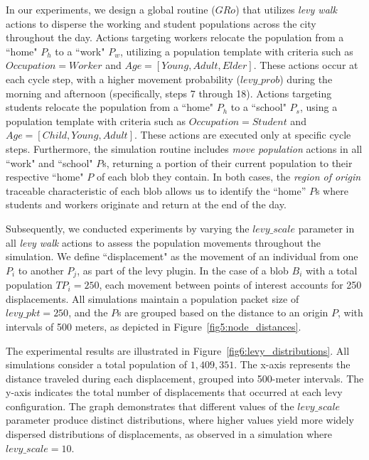 \documentclass[pdflatex,sn-mathphys-num]{sn-jnl}%
\theoremstyle{thmstyleone}%
\theoremstyle{thmstyletwo}%
\theoremstyle{thmstylethree}%
\begin{document}
In our experiments, we design a global routine ($GRo$) that utilizes \textit{levy walk} actions to disperse the working and student populations across the city throughout the day. Actions targeting workers relocate the population from a ``home" $P_h$ to a ``work" $P_w$, utilizing a population template with criteria such as $Occupation = Worker$ and $Age = [Young, Adult, Elder]$. These actions occur at each cycle step, with a higher movement probability ($levy\_prob$) during the morning and afternoon (specifically, steps 7 through 18).
Actions targeting students relocate the population from a ``home" $P_h$ to a ``school" $P_s$, using a population template with criteria such as $Occupation = Student$ and $Age = [Child, Young, Adult]$. These actions are executed only at specific cycle steps. Furthermore, the simulation routine includes \textit{move population} actions in all ``work" and ``school" $P$s, returning a portion of their current population to their respective ``home" $P$ of each blob they contain. In both cases, the \textit{region of origin} traceable characteristic of each blob allows us to identify the ``home'' $P$s where students and workers originate and return at the end of the day.

Subsequently, we conducted experiments by varying the $levy\_scale$ parameter in all \textit{levy walk} actions to assess the population movements throughout the simulation. We define ``displacement" as the movement of an individual from one $P_i$ to another $P_j$, as part of the levy plugin.
In the case of a blob $B_i$ with a total population $TP_i = 250$, each movement between points of interest accounts for 250 displacements. All simulations maintain a population packet size of $levy\_pkt = 250$, and the $P$s are grouped based on the distance to an origin $P$, with intervals of 500 meters, as depicted in Figure~\ref{fig5:node_distances}.

The experimental results are illustrated in Figure~\ref{fig6:levy_distributions}. All simulations consider a total population of $1,409,351$. The x-axis represents the distance traveled during each displacement, grouped into 500-meter intervals.
The y-axis indicates the total number of displacements that occurred at each levy configuration. The graph demonstrates that different values of the $levy\_scale$ parameter produce distinct distributions, where higher values yield more widely dispersed distributions of displacements, as observed in a simulation where $levy\_scale = 10$.
\end{document}
